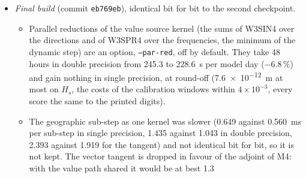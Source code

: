 \documentclass[11pt,a4paper]{article}
\begin{document}
\begin{itemize}
\begin{itemize}
per unit of this kernel, and the first day takes \SI{509.9}{s}, identical
bit for bit, with the M3 check unchanged (job 4461185).
\item The registers per unit, read from the PTX and at run time, are 128
for the single-precision value kernel, 255 in double precision and 168
for the tangent. CubeCL declares only the number of units per cube, so
the registers cannot be capped. In double precision W3SIN4 takes 27\,\%
of the value kernel, W3SDS4 8\,\% and the DIA 6\,\%.
\item Overall, from the present build: 124.1 to \SI{98.8}{s} per model
day in single precision ($-20\,\%$), 505.1 to \SI{246.1}{s} in double
precision ($-51\,\%$), 931.4 to \SI{509.9}{s} for the tangent
($-45\,\%$).
\item The single-precision tangent produced NaN at the first step: below
$B=0.2$ the square $B_B^2$ of W3SDB1 underflows to zero in single
precision and its tangent becomes $0/0$. That term is now set to zero
where $Q_B=0$, which changes nothing in double precision. The tangent is
then finite and takes \SI{302}{s} for the first day, but it grows wrong
over the 156 hours of the training window: its $H_s$ tangent reaches
$9\times10^{9}$ at some nodes, the altimeter column of the Jacobian is
26\,\% off in relative $L_2$, and $\partial J/\partial\ln\beta_{\max}$
is $1.921\times10^{4}$ against $1.797\times10^{4}$ in double precision
(job 4460585). It is not used.
\end{itemize}
\item \emph{Final build} (commit \texttt{eb769eb}), identical bit for
bit to the second checkpoint.
\begin{itemize}
\item Parallel reductions of the value source kernel (the sums of W3SIN4
over the directions and of W3SPR4 over the frequencies, the minimum of
the dynamic step) are an option, \texttt{--par-red}, off by default.
They take 48 hours in double precision from 245.3 to \SI{228.6}{s} per
model day ($-6.8\,\%$) and gain nothing in single precision, at
round-off (\SI{7.6e-12}{m} at most on $H_s$, the costs of the
calibration windows within $4\times10^{-3}$, every score the same to the
printed digits).
\item The geographic sub-step as one kernel was slower (0.649 against
\SI{0.560}{ms} per sub-step in single precision, 1.435 against 1.043 in
double precision, 2.393 against 1.919 for the tangent) and not identical
bit for bit, so it is not kept. The vector tangent is dropped in favour
of the adjoint of M4: with the value path shared it would be at best 1.3

\end{itemize}
\end{itemize}
\end{document}

